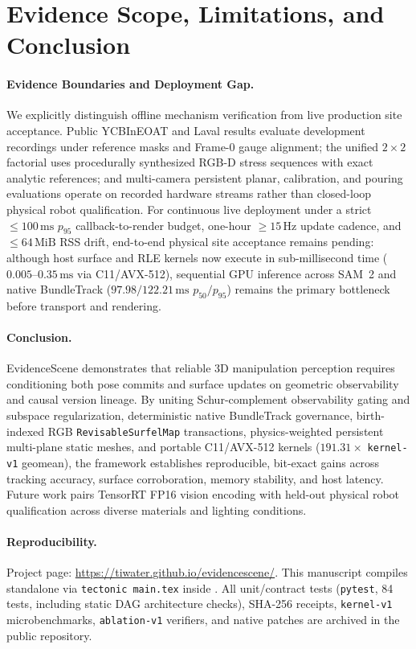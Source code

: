 \documentclass{evidencescene}
\begin{document}
\section{Evidence Scope, Limitations, and Conclusion}
\label{sec:limitations}

\paragraph{Evidence Boundaries and Deployment Gap.} We explicitly distinguish offline mechanism verification from live production site acceptance. Public YCBInEOAT and Laval results evaluate development recordings under reference masks and Frame-0 gauge alignment; the unified $2\times 2$ factorial uses procedurally synthesized RGB-D stress sequences with exact analytic references; and multi-camera persistent planar, calibration, and pouring evaluations operate on recorded hardware streams rather than closed-loop physical robot qualification. For continuous live deployment under a strict $\le 100\,\mathrm{ms}$ $p_{95}$ callback-to-render budget, one-hour $\ge 15\,\mathrm{Hz}$ update cadence, and $\le 64\,\mathrm{MiB}$ RSS drift, end-to-end physical site acceptance remains pending: although host surface and RLE kernels now execute in sub-millisecond time ($0.005$--$0.35\,\mathrm{ms}$ via C11/AVX-512), sequential GPU inference across SAM~2 and native BundleTrack ($97.98/122.21\,\mathrm{ms}$ $p_{50}/p_{95}$) remains the primary bottleneck before transport and rendering.

\paragraph{Conclusion.} EvidenceScene demonstrates that reliable 3D manipulation perception requires conditioning both pose commits and surface updates on geometric observability and causal version lineage. By uniting Schur-complement observability gating and subspace regularization, deterministic native BundleTrack governance, birth-indexed RGB \texttt{RevisableSurfelMap} transactions, physics-weighted persistent multi-plane static meshes, and portable C11/AVX-512 kernels ($191.31\times$ \texttt{kernel-v1} geomean), the framework establishes reproducible, bit-exact gains across tracking accuracy, surface corroboration, memory stability, and host latency. Future work pairs TensorRT FP16 vision encoding with held-out physical robot qualification across diverse materials and lighting conditions.

\paragraph{Reproducibility.} Project page: \url{https://tiwater.github.io/evidencescene/}. This manuscript compiles standalone via \texttt{tectonic main.tex} inside . All unit/contract tests (\texttt{pytest}, 84 tests, including static DAG architecture checks), SHA-256 receipts, \texttt{kernel-v1} microbenchmarks, \texttt{ablation-v1} verifiers, and native patches are archived in the public repository.
\end{document}
